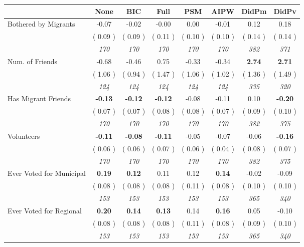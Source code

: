 \begin{tabular}{l c c c c c c c}
\toprule
 & None & BIC & Full & PSM & AIPW & DidPm & DidPv \\
\midrule
Bothered by Migrants &     -0.07 &     -0.02 &     -0.00 &      0.00 &     -0.01 &      0.12 &      0.18 \\
& (     0.09 ) & (     0.09 ) & (     0.11 ) & (     0.10 ) & (     0.10 ) & (     0.14 ) & (     0.14 ) \\
& \textit{ 170 } & \textit{ 170 } & \textit{ 170 } & \textit{ 170 } & \textit{ 170 } & \textit{ 382 } & \textit{ 371 } \\
Num. of Friends &     -0.68 &     -0.46 &      0.75 &     -0.33 &     -0.34 & \textbf{      2.74 } & \textbf{      2.71 } \\
& (     1.06 ) & (     0.94 ) & (     1.47 ) & (     1.06 ) & (     1.02 ) & (     1.36 ) & (     1.49 ) \\
& \textit{ 124 } & \textit{ 124 } & \textit{ 124 } & \textit{ 124 } & \textit{ 124 } & \textit{ 335 } & \textit{ 320 } \\
Has Migrant Friends & \textbf{     -0.13 } & \textbf{     -0.12 } & \textbf{     -0.12 } &     -0.08 &     -0.11 &      0.10 & \textbf{     -0.20 } \\
& (     0.07 ) & (     0.07 ) & (     0.08 ) & (     0.08 ) & (     0.07 ) & (     0.09 ) & (     0.10 ) \\
& \textit{ 170 } & \textit{ 170 } & \textit{ 170 } & \textit{ 170 } & \textit{ 170 } & \textit{ 382 } & \textit{ 375 } \\
Volunteers & \textbf{     -0.11 } & \textbf{     -0.08 } & \textbf{     -0.11 } &     -0.05 &     -0.07 &     -0.06 & \textbf{     -0.16 } \\
& (     0.06 ) & (     0.06 ) & (     0.07 ) & (     0.06 ) & (     0.04 ) & (     0.08 ) & (     0.07 ) \\
& \textit{ 170 } & \textit{ 170 } & \textit{ 170 } & \textit{ 170 } & \textit{ 170 } & \textit{ 382 } & \textit{ 375 } \\
Ever Voted for Municipal & \textbf{      0.19 } & \textbf{      0.12 } &      0.11 &      0.12 & \textbf{     0.14} &     -0.02 &     -0.09 \\
& (     0.08 ) & (     0.08 ) & (     0.08 ) & (     0.11 ) & (     0.08 ) & (     0.10 ) & (     0.10 ) \\
& \textit{ 153 } & \textit{ 153 } & \textit{ 153 } & \textit{ 153 } & \textit{ 153 } & \textit{ 365 } & \textit{ 340 } \\
Ever Voted for Regional & \textbf{      0.20 } & \textbf{      0.14 } & \textbf{      0.13 } &      0.14 & \textbf{     0.16} &      0.05 &     -0.10 \\
& (     0.08 ) & (     0.08 ) & (     0.08 ) & (     0.11 ) & (     0.08 ) & (     0.09 ) & (     0.10 ) \\
& \textit{ 153 } & \textit{ 153 } & \textit{ 153 } & \textit{ 153 } & \textit{ 153 } & \textit{ 365 } & \textit{ 340 } \\
\bottomrule
\end{tabular}
